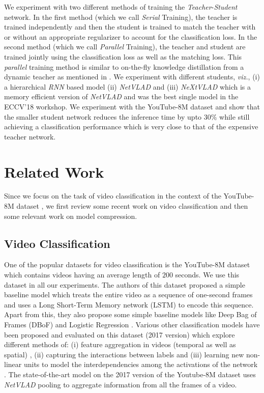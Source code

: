 \documentclass[10pt,twocolumn,letterpaper]{article}
\begin{document}
We experiment with two different methods of training the \textit{Teacher}-\textit{Student} network. In the first method (which we call \textit{Serial} Training), the teacher is trained independently and then the student is trained to match the teacher with or without an appropriate regularizer to account for the classification loss. In the second method (which we call \textit{Parallel} Training), the teacher and student are trained jointly using the classification loss as well as the matching loss. This \textit{parallel} training method is similar to on-the-fly knowledge distillation from a dynamic teacher as mentioned in \cite{parallel}. We experiment with different students, \textit{viz.}, (i) a hierarchical \textit{RNN} based model (ii) \textit{NetVLAD} and (iii) \textit{NeXtVLAD} which is a memory efficient version of \textit{NetVLAD} and was the best single model in the ECCV'18 workshop. We experiment with the YouTube-8M dataset and show that the smaller student network reduces the inference time by upto $30\%$ while still achieving a classification performance which is very close to that of the expensive teacher network. 

\section{Related Work}
Since we focus on the task of video classification in the context of the YouTube-8M dataset \cite{Youtube8m}, we first review some recent work on video classification and then some relevant work on model compression.

\subsection{Video Classification} One of the popular datasets for video classification is the YouTube-8M dataset which contains videos having an average length of $200$ seconds. We use this dataset in all our experiments. The authors of this dataset proposed a simple baseline model which treats the entire video as a sequence of one-second frames and uses a Long Short-Term Memory network (LSTM) to encode this sequence. Apart from this, they also propose some simple baseline models like Deep Bag of Frames (DBoF) and Logistic Regression \cite{Youtube8m}.
Various other classification models \cite{willow,monkey-typing,temporal-models-yt8m,aggregate-frame-features,deep-models-videos} have been proposed and evaluated on this dataset (2017 version) which explore different methods of: (i) feature aggregation in videos
(temporal as well as spatial) \cite{aggregate-frame-features,willow}, (ii) capturing the interactions between labels \cite{monkey-typing} and (iii) learning new non-linear units to model the interdependencies among the activations of the network \cite{willow}. The state-of-the-art model on the 2017 version of the Youtube-8M dataset uses \textit{NetVLAD} pooling \cite{willow} to aggregate information from all the frames of a video. 
\end{document}
